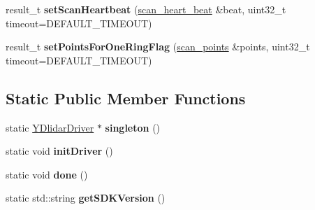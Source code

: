 \begin{DoxyCompactItemize}
\item 
result\+\_\+t {\bfseries set\+Scan\+Heartbeat} (\hyperlink{structscan__heart__beat}{scan\+\_\+heart\+\_\+beat} \&beat, uint32\+\_\+t timeout=D\+E\+F\+A\+U\+L\+T\+\_\+\+T\+I\+M\+E\+O\+UT)\hypertarget{classydlidar_1_1_y_dlidar_driver_ab2d5434c9b640a38f9d3b43b07c0b3eb}{}\label{classydlidar_1_1_y_dlidar_driver_ab2d5434c9b640a38f9d3b43b07c0b3eb}

\item 
result\+\_\+t {\bfseries set\+Points\+For\+One\+Ring\+Flag} (\hyperlink{structscan__points}{scan\+\_\+points} \&points, uint32\+\_\+t timeout=D\+E\+F\+A\+U\+L\+T\+\_\+\+T\+I\+M\+E\+O\+UT)\hypertarget{classydlidar_1_1_y_dlidar_driver_a1c8d40889885386e6c5a7827b7747696}{}\label{classydlidar_1_1_y_dlidar_driver_a1c8d40889885386e6c5a7827b7747696}

\end{DoxyCompactItemize}
\subsection*{Static Public Member Functions}
\begin{DoxyCompactItemize}
\item 
static \hyperlink{classydlidar_1_1_y_dlidar_driver}{Y\+Dlidar\+Driver} $\ast$ {\bfseries singleton} ()\hypertarget{classydlidar_1_1_y_dlidar_driver_ae647504b6232c8fce584ca2d011a07d3}{}\label{classydlidar_1_1_y_dlidar_driver_ae647504b6232c8fce584ca2d011a07d3}

\item 
static void {\bfseries init\+Driver} ()\hypertarget{classydlidar_1_1_y_dlidar_driver_a15629ca7d39a463d1b18a5e35300dfe7}{}\label{classydlidar_1_1_y_dlidar_driver_a15629ca7d39a463d1b18a5e35300dfe7}

\item 
static void {\bfseries done} ()\hypertarget{classydlidar_1_1_y_dlidar_driver_a167ea8a27d77fae98488f1ba7f31969c}{}\label{classydlidar_1_1_y_dlidar_driver_a167ea8a27d77fae98488f1ba7f31969c}

\item 
static std\+::string {\bfseries get\+S\+D\+K\+Version} ()\hypertarget{classydlidar_1_1_y_dlidar_driver_a542dc18ac8dbcda2a51657cf9bd44ae0}{}\label{classydlidar_1_1_y_dlidar_driver_a542dc18ac8dbcda2a51657cf9bd44ae0}

\end{DoxyCompactItemize}
